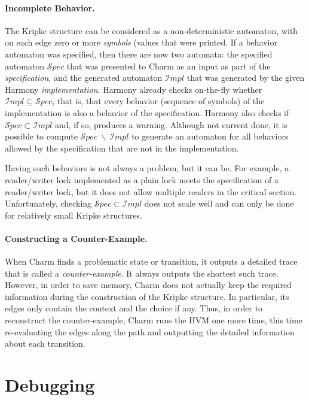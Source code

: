 \documentclass[twocolumn]{article}
\begin{document}
\paragraph{Incomplete Behavior.}

The Kripke structure can be considered as a non-deterministic
automaton, with on each edge zero or more \emph{symbols} (values
that were printed.  If a behavior automaton was specified,
then there are now two automata: the specified automaton
${\mathcal Spec}$ that was presented to Charm as an input as
part of the \emph{specification}, and the generated automaton
${\mathcal Impl}$ that was generated by the given Harmony
\emph{implementation}.  Harmony already checks on-the-fly whether
${\mathcal Impl} \subseteq {\mathcal Spec}$, that is, that every
behavior (sequence of symbols) of the implementation is also a
behavior of the specification.  Harmony also checks if
${\mathcal Spec} \subset {\mathcal Impl}$ and, if so,
produces a warning.
Although not current done, it is possible to compute
${\mathcal Spec}~\backslash~{\mathcal Impl}$
to generate an automaton for all behaviors allowed by the
specification that are not in the implementation.

Having such behaviors is not always a problem, but it can be.  For
example, a reader/writer lock implemented as a plain lock meets the
specification of a reader/writer lock, but it does not allow multiple
readers in the critical section.  Unfortunately, checking ${\mathcal
Spec} \subset {\mathcal Impl}$ does not scale well and can only be
done for relatively small Kripke structures.

\paragraph{Constructing a Counter-Example.}

When Charm finds a problematic state or transition, it outputs
a detailed trace that is called a \emph{counter-example}.
It always outputs the shortest such trace.
However, in order to save memory, Charm does not actually keep
the required information during the construction of the Kripke
structure.  In particular, its edges only contain the context
and the choice if any.  Thus, in order to reconstruct the
counter-example, Charm runs the HVM one more time, this time
re-evaluating the edges along the path and outputting the
detailed information about each transition.

\section{Debugging}
\end{document}
